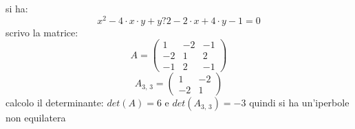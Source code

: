\documentclass[a4paper,12pt, oneside]{book}
\begin{document}
\begin{esercizio}
si ha:
$$x^2-4\cdot x\cdot y+y?2-2\cdot x+4\cdot y-1=0$$
scrivo la matrice:
$$
A=\left(\begin{matrix}
1 & -2 & -1\\
-2 & 1 & 2\\
-1 & 2 & -1
\end{matrix}\right)
$$
$$
A_{3,\,3}=\left(\begin{matrix}
1 & -2\\
-2 & 1
\end{matrix}\right)
$$
calcolo il determinante: $det(A)=6$ e $det(A_{3,\,3})=-3$ quindi si ha un'iperbole non equilatera
\end{esercizio}
\end{document}
